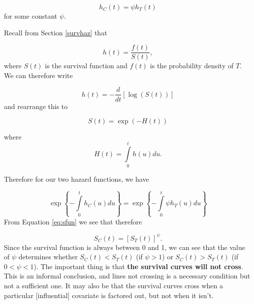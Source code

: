 \documentclass[
  openany]{book}
\theoremstyle{definition}
\theoremstyle{definition}
\theoremstyle{definition}
\theoremstyle{definition}
\theoremstyle{remark}
\begin{document}
\[h_C\left(t\right) = \psi h_T\left(t\right) \]
for some constant \(\psi\).

Recall from Section \ref{survhaz} that

\[h\left(t\right) = \frac{f\left(t\right)}{S\left(t\right)},\]
where \(S\left(t\right)\) is the survival function and \(f\left(t\right)\) is the probability density of \(T\). We can therefore write

\[h\left(t\right) = -\frac{d}{dt}\left[\log\left(S\left(t\right)\right)\right]\]
and rearrange this to

\begin{equation}
S\left(t\right) = \exp \left(-H\left(t\right)\right)
\label{eq:sfun}
\end{equation}

where \[H\left(t\right) = \int\limits_0^t h\left(u\right) du.\]

Therefore for our two hazard functions, we have

\[\exp\left\lbrace - \int\limits_0^t h_C\left(u\right)du \right\rbrace =\exp\left\lbrace -\int\limits_0^t\psi h_T\left(u\right) du \right\rbrace  \]
From Equation \eqref{eq:sfun} we see that therefore

\[S_C\left(t\right) = \left[S_T\left(t\right)\right]^\psi.\]
Since the survival function is always between 0 and 1, we can see that the value of \(\psi\) determines whether \(S_C\left(t\right)<S_T\left(t\right)\) (if \(\psi>1\)) or \(S_C\left(t\right)>S_T\left(t\right)\) (if \(0<\psi<1\)). The important thing is that \textbf{the survival curves will not cross}. This is an informal conclusion, and lines not crossing is a necessary condition but not a sufficient one. It may also be that the survival curves cross when a particular {[}influential{]} covariate is factored out, but not when it isn't.
\end{document}
